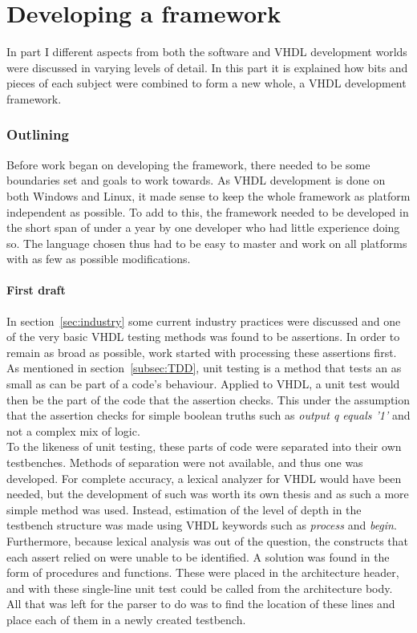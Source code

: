 \documentclass[11pt,british]{article}
\begin{document}
\newpage
\part{Developing a framework}
In part I different aspects from both the software and \gls{VHDL} development worlds were discussed in  varying levels of detail. In this part it is explained how bits and pieces of each subject were combined to form a new whole, a VHDL development framework.

\section{Outlining}
\label{sec:outlining}
Before work began on developing the framework, there needed to be some boundaries set and goals to work towards. As VHDL development is done on both Windows and Linux, it made sense to keep the whole framework as platform independent as possible. To add to this, the framework needed to be developed in the short span of under a year by one developer who had little experience doing so. The language chosen thus had to be easy to master and work on all platforms with as few as possible modifications.

\subsection{First draft}
\label{subsec:first}
In section~\ref{sec:industry} some current industry practices were discussed and one of the very basic VHDL testing methods was found to be assertions. In order to remain as broad as possible, work started with processing these assertions first. As mentioned in section~\ref{subsec:TDD}, unit testing is a method that tests an as small as can be part of a code's behaviour. Applied to \gls{VHDL}, a unit test would then be the part of the code that the assertion checks. This under the assumption that the assertion checks for simple boolean truths such as \emph{output q equals '1'} and not a complex mix of logic.
\\[\baselineskip]
To the likeness of unit testing, these parts of code were separated into their own testbenches. Methods of separation were not available, and thus one was developed. For complete accuracy, a lexical analyzer for VHDL would have been needed, but the development of such was worth its own thesis and as such a more simple method was used. Instead, estimation of the level of depth in the testbench structure was made using VHDL keywords such as \emph{process} and \emph{begin}.
\\[\baselineskip]
Furthermore, because lexical analysis was out of the question, the constructs that each assert relied on were unable to be identified. A solution was found in the form of procedures and functions. These were placed in the architecture header, and with these single-line unit test could be called from the architecture body. All that was left for the parser to do was to find the location of these lines and place each of them in a newly created testbench.
\end{document}
